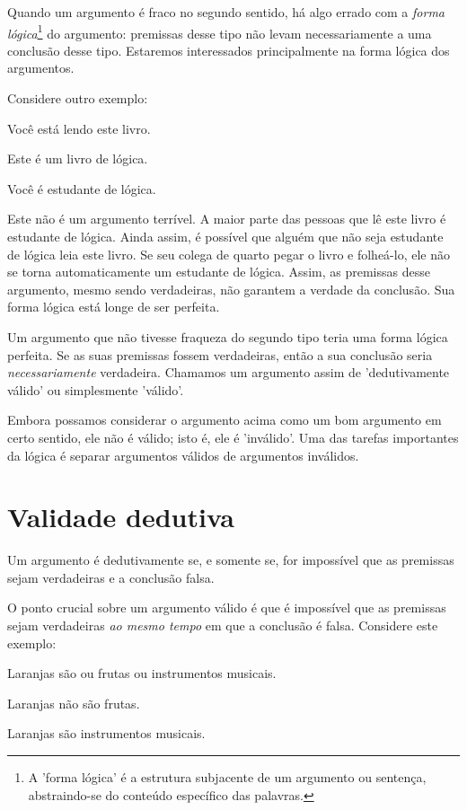 Quando um argumento é fraco no segundo sentido, há algo errado com a \emph{forma lógica}\footnote{A 'forma lógica' é a estrutura subjacente de um argumento ou sentença, abstraindo-se do conteúdo específico das palavras.} do argumento: premissas desse tipo não levam necessariamente a uma conclusão desse tipo. Estaremos interessados principalmente na forma lógica dos argumentos.

Considere outro exemplo:
\begin{earg}
\item[] Você está lendo este livro.
\item[] Este é um livro de lógica.
\item[\therefore] Você é estudante de lógica.
\end{earg}
Este não é um argumento terrível. A maior parte das pessoas que lê este livro é estudante de lógica. Ainda assim, é possível que alguém que não seja estudante de lógica leia este livro. Se seu colega de quarto pegar o livro e folheá-lo, ele não se torna automaticamente um estudante de lógica. Assim, as premissas desse argumento, mesmo sendo verdadeiras, não garantem a verdade da conclusão. Sua forma lógica está longe de ser perfeita.

Um argumento que não tivesse fraqueza do segundo tipo teria uma forma lógica perfeita. Se as suas premissas fossem verdadeiras, então a sua conclusão seria \emph{necessariamente} verdadeira. Chamamos um argumento assim de 'dedutivamente válido' ou simplesmente 'válido'.

Embora possamos considerar o argumento acima como um bom argumento em certo sentido, ele não é válido; isto é, ele é 'inválido'. Uma das tarefas importantes da lógica é separar argumentos válidos de argumentos inválidos.

\section{Validade dedutiva}
Um argumento é dedutivamente  se, e somente se, for impossível que as premissas sejam verdadeiras e a conclusão falsa.

O ponto crucial sobre um argumento válido é que é impossível que as premissas sejam verdadeiras \emph{ao mesmo tempo} em que a conclusão é falsa. Considere este exemplo:

\begin{earg}
\item[] Laranjas são ou frutas ou instrumentos musicais.
\item[] Laranjas não são frutas.
\item[\therefore] Laranjas são instrumentos musicais.
\end{earg}

